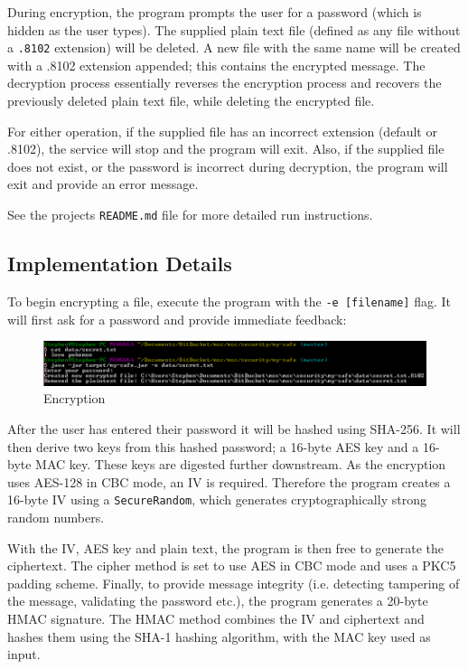 \documentclass[journal,comsoc]{IEEEtran}
\begin{document}
	During encryption, the program prompts the user for a password (which is hidden as the user types). The supplied plain text file (defined as any file without a \texttt{.8102} extension) will be deleted. A new file with the same name will be created with a .8102 extension appended; this contains the encrypted message. The decryption process essentially reverses the encryption process and recovers the previously deleted plain text file, while deleting the encrypted file. 
	
	For either operation, if the supplied file has an incorrect extension (default or .8102), the service will stop and the program will exit. Also, if the supplied file does not exist, or the password is incorrect during decryption, the program will exit and provide an error message.
	
	See the projects \texttt{README.md} file for more detailed run instructions.
	
	\subsection{Implementation Details}
	
	
	To begin encrypting a file, execute the program with the \texttt{-e [filename]} flag. It will first ask for a password and provide immediate feedback:
	
	\begin{figure}[h!]
		\centering
		\includegraphics[width=0.9\linewidth]{images/safe_encrypt.png}
		\caption{Encryption}
		\label{fig:encryption}
	\end{figure}
	
	After the user has entered their password it will be hashed using SHA-256. It will then derive two keys from this hashed password; a 16-byte AES key and a 16-byte MAC key. These keys are digested further downstream. As the encryption uses AES-128 in CBC mode, an IV is required. Therefore the program creates a 16-byte IV using a \texttt{SecureRandom}, which generates cryptographically strong random numbers. 
	
	With the IV, AES key and plain text, the program is then free to generate the ciphertext. The cipher method is set to use AES in CBC mode and uses a PKC5 padding scheme. Finally, to provide message integrity (i.e. detecting tampering of the message, validating the password etc.), the program generates a 20-byte HMAC signature. The HMAC method combines the IV and ciphertext and hashes them using the SHA-1 hashing algorithm, with the MAC key used as input.
	
\end{document}
